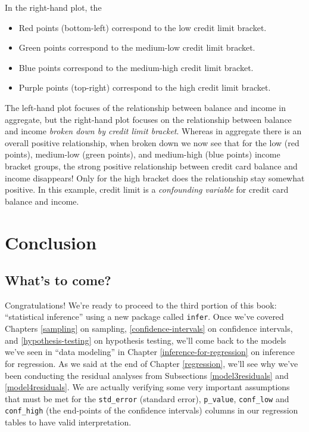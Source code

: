 \documentclass[12pt,]{krantz}
\providecommand{\tightlist}{%
  \setlength{\itemsep}{0pt}\setlength{\parskip}{0pt}}
\theoremstyle{definition}
\theoremstyle{definition}
\theoremstyle{definition}
\theoremstyle{remark}
\begin{document}
In the right-hand plot, the

\begin{itemize}
\tightlist
\item
  Red points (bottom-left) correspond to the low credit limit bracket.
\item
  Green points correspond to the medium-low credit limit bracket.
\item
  Blue points correspond to the medium-high credit limit bracket.
\item
  Purple points (top-right) correspond to the high credit limit bracket.
\end{itemize}

The left-hand plot focuses of the relationship between balance and
income in aggregate, but the right-hand plot focuses on the relationship
between balance and income \emph{broken down by credit limit bracket}.
Whereas in aggregate there is an overall positive relationship, when
broken down we now see that for the low (red points), medium-low (green
points), and medium-high (blue points) income bracket groups, the strong
positive relationship between credit card balance and income disappears!
Only for the high bracket does the relationship stay somewhat positive.
In this example, credit limit is a \emph{confounding variable} for
credit card balance and income.

\section{Conclusion}\label{conclusion-5}

\subsection{What's to come?}\label{whats-to-come-4}

Congratulations! We're ready to proceed to the third portion of this
book: ``statistical inference'' using a new package called
\texttt{infer}. Once we've covered Chapters \ref{sampling} on sampling,
\ref{confidence-intervals} on confidence intervals, and
\ref{hypothesis-testing} on hypothesis testing, we'll come back to the
models we've seen in ``data modeling'' in Chapter
\ref{inference-for-regression} on inference for regression. As we said
at the end of Chapter \ref{regression}, we'll see why we've been
conducting the residual analyses from Subsections \ref{model3residuals}
and \ref{model4residuals}. We are actually verifying some very important
assumptions that must be met for the \texttt{std\_error} (standard
error), \texttt{p\_value}, \texttt{conf\_low} and \texttt{conf\_high}
(the end-points of the confidence intervals) columns in our regression
tables to have valid interpretation.
\end{document}
